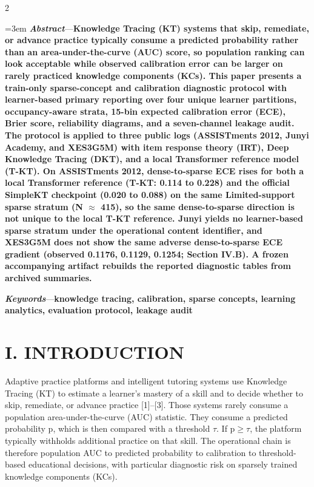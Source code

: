 \documentclass[10pt,a4paper]{article}
\begin{document}
\begin{multicols}{2}
{\fontsize{9}{9.9}\selectfont
{}
\emergencystretch=3em
\textbf{\textit{Abstract}}---\textbf{Knowledge Tracing (KT) systems that skip, remediate, or advance practice typically consume a predicted probability rather than an area-under-the-curve (AUC) score, so population ranking can look acceptable while observed calibration error can be larger on rarely practiced knowledge components (KCs). This paper presents a train-only sparse-concept and calibration diagnostic protocol with learner-based primary reporting over four unique learner partitions, occupancy-aware strata, 15-bin expected calibration error (ECE), Brier score, reliability diagrams, and a seven-channel leakage audit. The protocol is applied to three public logs (ASSISTments 2012, Junyi Academy, and XES3G5M) with item response theory (IRT), Deep Knowledge Tracing (DKT), and a local Transformer reference model (T-KT). On ASSISTments 2012, dense-to-sparse ECE rises for both a local Transformer reference (T-KT: 0.114 to 0.228) and the official SimpleKT checkpoint (0.020 to 0.088) on the same Limited-support sparse stratum (N $\approx$ 415), so the same dense-to-sparse direction is not unique to the local T-KT reference. Junyi yields no learner-based sparse stratum under the operational content identifier, and XES3G5M does not show the same adverse dense-to-sparse ECE gradient (observed 0.1176, 0.1129, 0.1254; Section IV.B). A frozen accompanying artifact rebuilds the reported diagnostic tables from archived summaries.}\par
\vspace{0.35em}
\textbf{\textit{Keywords}}---\textbf{knowledge tracing, calibration, sparse concepts, learning analytics, evaluation protocol, leakage audit}\par
}
\vspace{0.45em}

\section*{\MakeUppercase{I. INTRODUCTION}}

 Adaptive practice platforms and intelligent tutoring systems use Knowledge Tracing (KT) to estimate a learner's mastery of a skill and to decide whether to skip, remediate, or advance practice [1]--[3]. Those systems rarely consume a population area-under-the-curve (AUC) statistic. They consume a predicted probability p, which is then compared with a threshold $\tau$. If p$\geq$$\tau$, the platform typically withholds additional practice on that skill. The operational chain is therefore population AUC to predicted probability to calibration to threshold-based educational decisions, with particular diagnostic risk on sparsely trained knowledge components (KCs).


\end{multicols}
\end{document}
